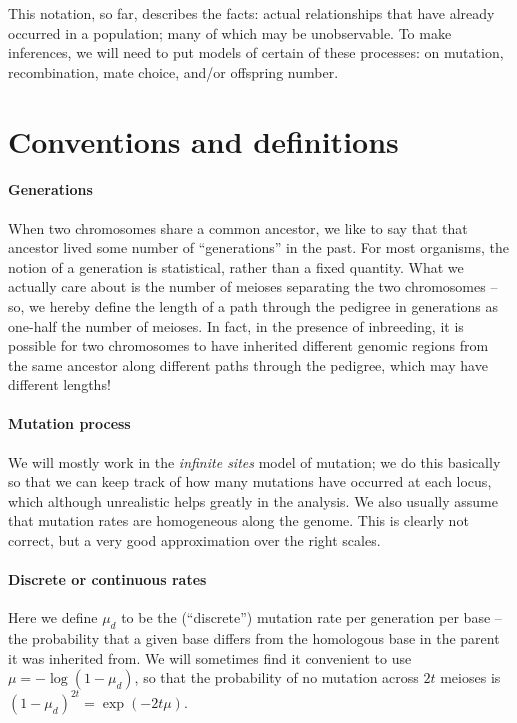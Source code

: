 This notation, so far, describes the facts:
actual relationships that have already occurred in a population;
many of which may be unobservable.
To make inferences, we will need to put models of certain of these processes:
on mutation, recombination, mate choice, and/or offspring number.


\section{Conventions and definitions}

\paragraph{Generations}
  When two chromosomes share a common ancestor, we like to say that that ancestor lived some number of ``generations'' in the past.
  For most organisms, the notion of a generation is statistical, rather than a fixed quantity.
  What we actually care about is the number of meioses separating the two chromosomes --
  so, we hereby define the length of a path through the pedigree in generations as one-half the number of meioses.
  In fact, in the presence of inbreeding, it is possible for two chromosomes to have inherited different genomic regions
  from the same ancestor along different paths through the pedigree, which may have different lengths!

\paragraph{Mutation process}
  We will mostly work in the \emph{infinite sites} model of mutation;
  we do this basically so that we can keep track of how many mutations have occurred at each locus,
  which although unrealistic helps greatly in the analysis.
  We also usually assume that mutation rates are homogeneous along the genome.
  This is clearly not correct, but a very good approximation over the right scales.


\paragraph{Discrete or continuous rates}
  Here we define $\mu_d$ to be the (``discrete'') mutation rate per generation per base 
  -- the probability that a given base differs from the homologous base in the parent it was inherited from.
  We will sometimes find it convenient to use $\mu = -\log(1-\mu_d)$,
  so that the probability of no mutation across $2t$ meioses is $(1-\mu_d)^{2t} = \exp(-2 t \mu )$.


